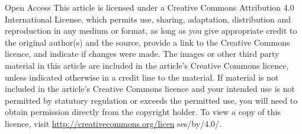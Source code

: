 \documentclass[10pt]{article}
\begin{document}
Open Access This article is licensed under a Creative Commons Attribution 4.0 International License, which permits use, sharing, adaptation, distribution and reproduction in any medium or format, as long as you give appropriate credit to the original author(s) and the source, provide a link to the Creative Commons licence, and indicate if changes were made. The images or other third party material in this article are included in the article's Creative Commons licence, unless indicated otherwise in a credit line to the material. If material is not included in the article's Creative Commons licence and your intended use is not permitted by statutory regulation or exceeds the permitted use, you will need to obtain permission directly from the copyright holder. To view a copy of this licence, visit \href{http://creativecommons.org/licen}{http://creativecommons.org/licen} ses/by/4.0/.
\end{document}
